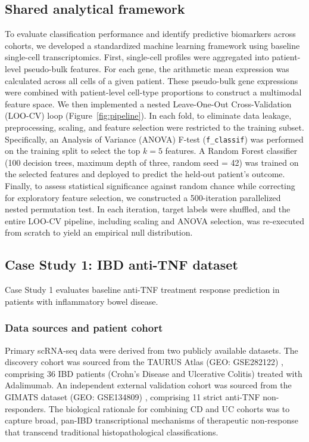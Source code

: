 \documentclass{bmcart}
\begin{document}
\subsection*{Shared analytical framework}
To evaluate classification performance and identify predictive biomarkers across cohorts, we developed a standardized machine learning framework using baseline single-cell transcriptomics. First, single-cell profiles were aggregated into patient-level pseudo-bulk features. For each gene, the arithmetic mean expression was calculated across all cells of a given patient. These pseudo-bulk gene expressions were combined with patient-level cell-type proportions to construct a multimodal feature space. We then implemented a nested Leave-One-Out Cross-Validation (LOO-CV) loop (Figure~\ref{fig:pipeline}). In each fold, to eliminate data leakage, preprocessing, scaling, and feature selection were restricted to the training subset. Specifically, an Analysis of Variance (ANOVA) F-test (\texttt{f\_classif}) was performed on the training split to select the top $k=5$ features. A Random Forest classifier (100 decision trees, maximum depth of three, random seed = 42) was trained on the selected features and deployed to predict the held-out patient's outcome. Finally, to assess statistical significance against random chance while correcting for exploratory feature selection, we constructed a 500-iteration parallelized nested permutation test. In each iteration, target labels were shuffled, and the entire LOO-CV pipeline, including scaling and ANOVA selection, was re-executed from scratch to yield an empirical null distribution.

\subsection*{Case Study 1: IBD anti-TNF dataset}
Case Study 1 evaluates baseline anti-TNF treatment response prediction in patients with inflammatory bowel disease.

\subsubsection*{Data sources and patient cohort}
Primary scRNA-seq data were derived from two publicly available datasets. The discovery cohort was sourced from the TAURUS Atlas (GEO: GSE282122) \cite{thomas}, comprising 36 IBD patients (Crohn's Disease and Ulcerative Colitis) treated with Adalimumab. An independent external validation cohort was sourced from the GIMATS dataset (GEO: GSE134809) \cite{martin}, comprising 11 strict anti-TNF non-responders. The biological rationale for combining CD and UC cohorts was to capture broad, pan-IBD transcriptional mechanisms of therapeutic non-response that transcend traditional histopathological classifications.
\end{document}
